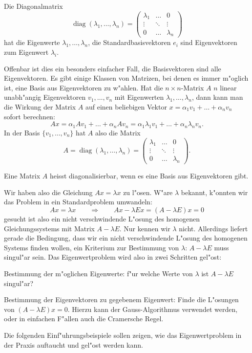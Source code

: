 \begin{hilfssatz}
Die Diagonalmatrix
\[
\operatorname{diag}(\lambda_1,\dots,\lambda_n)
=\begin{pmatrix}
\lambda_1&\dots&0\\
\vdots&\ddots&\vdots\\
0&\dots&\lambda_n
\end{pmatrix}
\]
hat die Eigenwerte $\lambda_1,\dots,\lambda_n$, die Standardbasisvektoren
$e_i$ sind Eigenvektoren zum Eigenwert $\lambda_i$.
\end{hilfssatz}
Offenbar ist dies ein besonders einfacher Fall, die Basisvektoren sind
alle Eigenvektoren.
Es gibt einige Klassen von Matrizen, bei denen es
immer m"oglich ist, eine Basis aus Eigenvektoren zu w"ahlen.
Hat die
$n\times n$-Matrix $A$ $n$ linear unabh"angig Eigenvektoren $v_1,\dots,v_n$
mit Eigenwerten $\lambda_1,\dots,\lambda_n$, dann kann man die Wirkung
der Matrix $A$ auf einen beliebigen Vektor $x=\alpha_1v_1+\dots+\alpha_nv_n$
sofort berechnen:
\[
Ax=\alpha_1Av_1+\dots+\alpha_nAv_n=\alpha_1\lambda_1v_1+\dots+\alpha_n\lambda_nv_n.
\]
In der Basis $\{v_1,\dots,v_n\}$ hat $A$ also die Matrix
\[
A=\operatorname{diag}(\lambda_1,\dots,\lambda_n)
=
\begin{pmatrix}
\lambda_1&\dots&0\\
\vdots&\ddots&\vdots\\
0&\dots&\lambda_n
\end{pmatrix}.
\]
\begin{definition}
Eine Matrix $A$ heisst diagonalisierbar, wenn es eine Basis aus
Eigenvektoren gibt.
\end{definition}

Wir haben also die Gleichung $Ax=\lambda x$ zu l"osen.
W"are $\lambda$ bekannt, k"onnten wir das Problem in ein Standardproblem
umwandeln:
\[
Ax=\lambda x\qquad\Rightarrow\qquad Ax-\lambda Ex=(A-\lambda E)x=0
\]
gesucht ist also ein nicht verschwindende L"osung des homogenen
Gleichungssystems mit
Matrix $A-\lambda E$.
Nur kennen wir $\lambda$ nicht.
Allerdings
liefert gerade die Bedingung, dass wir ein nicht verschwindende
L"osung des homogenen Systems finden wollen, ein Kriterium zur
Bestimmung von $\lambda$: $A-\lambda E$ muss singul"ar sein.
Das Eigenwertproblem wird also in zwei Schritten gel"ost:
\begin{compactenum}
\item Bestimmung der m"oglichen Eigenwerte: f"ur welche Werte von $\lambda$
ist $A-\lambda E$ singul"ar?
\item Bestimmung der Eigenvektoren zu gegebenem Eigenwert: Finde die
L"osungen von $(A-\lambda E)x=0$.
Hierzu kann der Gauss-Algorithmus
verwendet werden, oder in einfachen F"allen auch die Cramersche Regel.
\end{compactenum}
Die folgenden Einf"uhrungsbeispiele sollen zeigen, wie das Eigenwertproblem
in der Praxis auftaucht und gel"ost werden kann.

